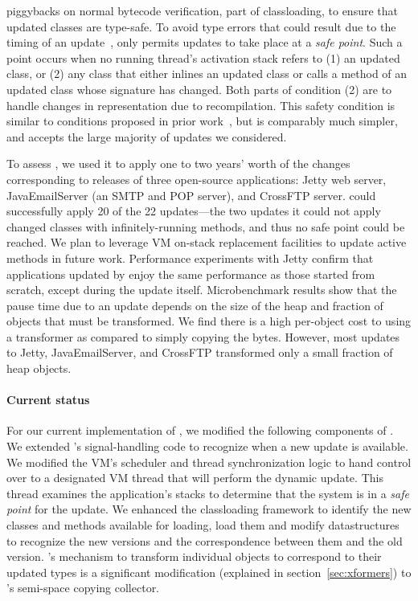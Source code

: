 \DSU{} piggybacks on normal bytecode verification, part of
classloading, to ensure that updated classes are type-safe.  To avoid
type errors that could result due to the timing of an
update~\cite{neamtiu06dsu,k42usenix}, \DSU{} only permits updates to
take place at a \emph{safe point}.  Such a point occurs when no
running thread's activation stack refers to (1) an updated class, or
(2) any class that either inlines an updated class or calls a
method of an updated class whose signature has changed.  Both parts of
condition (2) are to handle changes in representation due to
recompilation.  This safety condition is similar to conditions proposed
in prior work~\cite{StoyleHBSN06,boyapati03lazy}, but is comparably much
simpler, and accepts the large majority of updates we considered.

To assess \DSU{}, we used it to apply one to two years' worth of the
changes corresponding to releases of three open-source applications:
Jetty web server, JavaEmailServer (an SMTP and POP server), and
CrossFTP server.  \DSU{} could successfully apply 20 of the 22
updates---the two updates it could not apply changed classes with
infinitely-running methods, and thus no safe point could be reached.
We plan to leverage VM on-stack replacement facilities to update
active methods in future work.  Performance experiments with Jetty confirm
that applications updated by \DSU{} enjoy the same performance as those started from
scratch, except during the update itself.  Microbenchmark results show
that the pause time due to an update depends on the size of the heap
and fraction of objects that must be transformed.  We find there is a
high per-object cost to using a transformer as compared to simply
copying the bytes.  However, most updates to Jetty, JavaEmailServer, and
CrossFTP
transformed only a small fraction of heap objects.

\paragraph{Current status}
For our current implementation of \DSU{}, we modified the following
components of \JikesRVM{}. We extended \JikesRVM{}'s signal-handling code
to recognize when a new update is available. We modified the VM's scheduler and
thread synchronization logic to hand control over to a designated VM thread
that will perform the dynamic update. This thread examines the
application's stacks to determine that the system is in a \emph{safe point}
for the update.  We enhanced the classloading framework to identify the new
classes and methods available for loading, load them and modify
datastructures to recognize the new versions and the correspondence between
them and the old version.  \DSU{}'s mechanism to transform individual
objects to correspond to their updated types is a significant modification
(explained in section~\ref{sec:xformers}) to \JikesRVM{}'s semi-space
copying collector.

